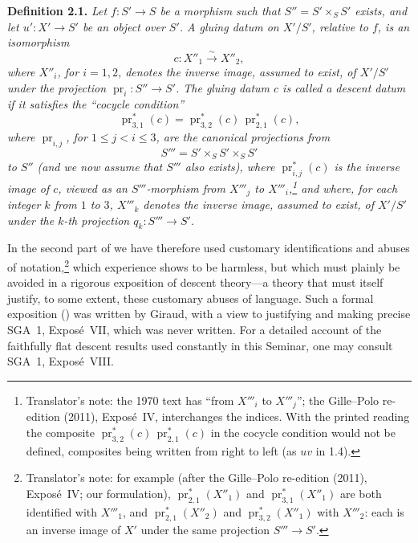 \medskip
\noindent{}\textbf{Definition 2.1.}
\textit{Let \(f:S'\to S\) be a morphism such that
\(S''=S'\times_SS'\) exists, and let \(u':X'\to S'\) be an object over
\(S'\). A \emph{gluing datum} on \(X'/S'\), relative to \(f\), is an
isomorphism}
\[
  c:X''_1\xrightarrow{\sim}X''_2,
\]
\textit{where \(X''_i\), for \(i=1,2\), denotes the inverse image, assumed
to exist, of \(X'/S'\) under the projection
\(\operatorname{pr}_i:S''\to S'\). The gluing datum \(c\) is called a
\emph{descent datum} if it satisfies the ``cocycle condition''}
\[
  \operatorname{pr}_{3,1}^{*}(c)
  =\operatorname{pr}_{3,2}^{*}(c)\,
   \operatorname{pr}_{2,1}^{*}(c),
\]
\textit{where \(\operatorname{pr}_{i,j}\), for
\(1\leq j<i\leq3\), are the canonical projections from}
\[
  S'''=S'\times_SS'\times_SS'
\]
\textit{to \(S''\) (and we now assume that \(S'''\) also exists), where
\(\operatorname{pr}_{i,j}^{*}(c)\) is the inverse image of \(c\), viewed
as an \(S'''\)-morphism from \(X'''_j\) to \(X'''_i\),\footnote{Translator's note: the 1970 text has ``from \(X'''_i\) to
\(X'''_j\)''; the Gille--Polo re-edition (2011), Expos\'e~IV, interchanges
the indices. With the printed reading the composite
\(\operatorname{pr}_{3,2}^{*}(c)\,\operatorname{pr}_{2,1}^{*}(c)\) in the
cocycle condition would not be defined, composites being written from right
to left (as \(uv\) in 1.4).} and where, for each
integer \(k\) from \(1\) to \(3\), \(X'''_k\) denotes the inverse image,
assumed to exist, of \(X'/S'\) under the \(k\)-th projection
\(q_k:S'''\to S'\).}

In the second part of  we have therefore used customary
identifications and abuses of notation,\footnote{Translator's note: for example (after the Gille--Polo
re-edition (2011), Expos\'e~IV; our formulation),
\(\operatorname{pr}_{2,1}^{*}(X''_1)\) and
\(\operatorname{pr}_{3,1}^{*}(X''_1)\) are both identified with
\(X'''_1\), and \(\operatorname{pr}_{2,1}^{*}(X''_2)\) and
\(\operatorname{pr}_{3,2}^{*}(X''_1)\) with \(X'''_2\): each is an inverse
image of \(X'\) under the same projection \(S'''\to S'\).} which experience shows to be
harmless, but which must plainly be avoided in a rigorous exposition of
descent theory---a theory that must itself justify, to some extent, these
customary abuses of language. Such a formal exposition () was written by
Giraud, with a view to justifying and making precise SGA~1, Expos\'e~VII,
which was never written. For a detailed account of the faithfully flat
descent results used constantly in this Seminar, one may consult SGA~1,
Expos\'e~VIII.

